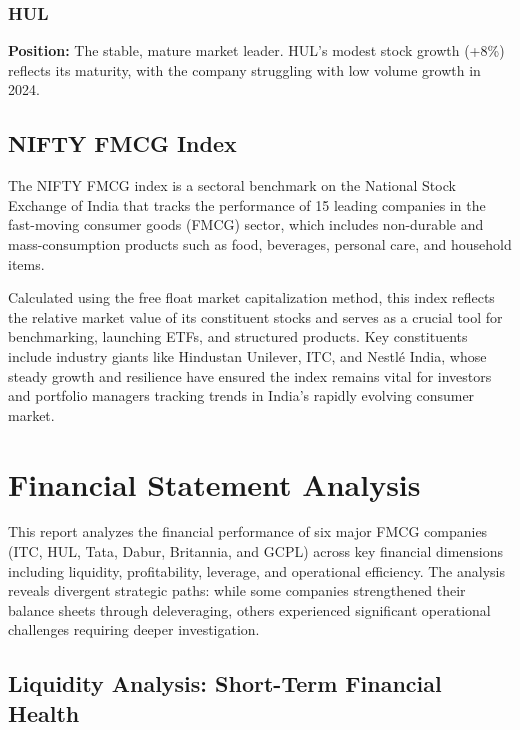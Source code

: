 \documentclass[12pt, a4paper]{report}
\begin{document}
\subsection{HUL}

\textbf{Position:} The stable, mature market leader. HUL's modest stock growth (+8\%) reflects its maturity, with the company struggling with low volume growth in 2024.

\section{NIFTY FMCG Index}

The NIFTY FMCG index is a sectoral benchmark on the National Stock Exchange of India that tracks the performance of 15 leading companies in the fast-moving consumer goods (FMCG) sector, which includes non-durable and mass-consumption products such as food, beverages, personal care, and household items. 

Calculated using the free float market capitalization method, this index reflects the relative market value of its constituent stocks and serves as a crucial tool for benchmarking, launching ETFs, and structured products. Key constituents include industry giants like Hindustan Unilever, ITC, and Nestlé India, whose steady growth and resilience have ensured the index remains vital for investors and portfolio managers tracking trends in India's rapidly evolving consumer market.

\newpage

\chapter{Financial Statement Analysis}

This report analyzes the financial performance of six major FMCG companies (ITC, HUL, Tata, Dabur, Britannia, and GCPL) across key financial dimensions including liquidity, profitability, leverage, and operational efficiency. The analysis reveals divergent strategic paths: while some companies strengthened their balance sheets through deleveraging, others experienced significant operational challenges requiring deeper investigation.

\section{Liquidity Analysis: Short-Term Financial Health}
\end{document}
